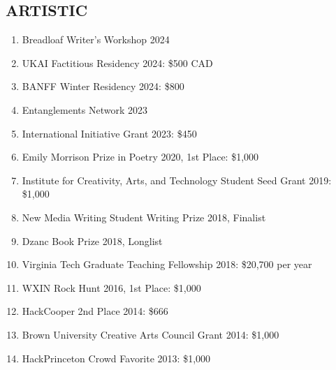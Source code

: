 \subsection{ARTISTIC}

\begin{enumerate}
    \item Breadloaf Writer's Workshop 2024
    \item UKAI Factitious Residency 2024: \$500 CAD
    \item BANFF Winter Residency 2024: \$800
    \item Entanglements Network 2023
    \item International Initiative Grant 2023: \$450
    \item Emily Morrison Prize in Poetry 2020, 1st Place: \$1,000
    \item Institute for Creativity, Arts, and Technology Student Seed Grant 2019: \$1,000
    \item New Media Writing Student Writing Prize 2018, Finalist
    \item Dzanc Book Prize 2018, Longlist
    \item Virginia Tech Graduate Teaching Fellowship 2018: \$20,700 per year
    \item WXIN Rock Hunt 2016, 1st Place: \$1,000
    \item HackCooper 2nd Place 2014: \$666
    \item Brown University Creative Arts Council Grant 2014: \$1,000
    \item HackPrinceton Crowd Favorite 2013: \$1,000
\end{enumerate}
